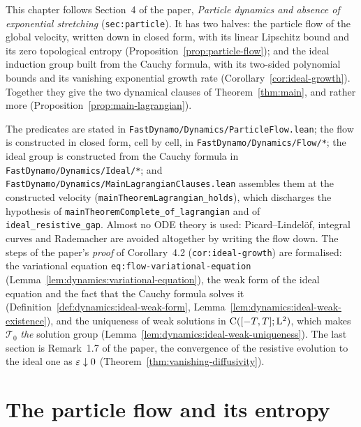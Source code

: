 This chapter follows Section~4 of the paper, \emph{Particle dynamics and absence of
exponential stretching} (\texttt{sec:particle}).  It has two halves: the
particle flow of the global velocity, written down in closed form, with its linear Lipschitz
bound and its zero topological entropy (Proposition~\ref{prop:particle-flow}); and the ideal
induction group built from the Cauchy formula, with its two-sided polynomial bounds and its
vanishing exponential growth rate (Corollary~\ref{cor:ideal-growth}).  Together they give
the two dynamical clauses of Theorem~\ref{thm:main}, and rather more
(Proposition~\ref{prop:main-lagrangian}).

The predicates are stated in
\texttt{FastDynamo/Dynamics/ParticleFlow.lean}; the flow is constructed in closed form, cell
by cell, in \texttt{FastDynamo/Dynamics/Flow/*}; the ideal group is constructed from the
Cauchy formula in \texttt{FastDynamo/Dynamics/Ideal/*}; and
\texttt{FastDynamo/Dynamics/MainLagrangianClauses.lean} assembles them at the constructed
velocity (\texttt{mainTheoremLagrangian\_holds}), which discharges the hypothesis of
\texttt{mainTheoremComplete\_of\_lagrangian} and of \texttt{ideal\_resistive\_gap}.  Almost
no ODE theory is used: Picard--Lindel\"of, integral curves and Rademacher are avoided
altogether by writing the flow down.  The steps of the paper's \emph{proof} of Corollary~4.2
(\texttt{cor:ideal-growth}) are formalised: the variational equation
\texttt{eq:flow-variational-equation} (Lemma~\ref{lem:dynamics:variational-equation}), the
weak form of the ideal equation and the fact that the Cauchy formula solves it
(Definition~\ref{def:dynamics:ideal-weak-form}, Lemma~\ref{lem:dynamics:ideal-weak-existence}),
and the uniqueness of weak solutions in $\mathrm{C}([-T,T];\mathrm{L}^2)$, which makes $\mathcal T_0$
\emph{the} solution group (Lemma~\ref{lem:dynamics:ideal-weak-uniqueness}).  The last section
is Remark~1.7 of the paper, the convergence of the resistive evolution to the ideal one as
$\varepsilon\downarrow0$ (Theorem~\ref{thm:vanishing-diffusivity}).

\section{The particle flow and its entropy}

